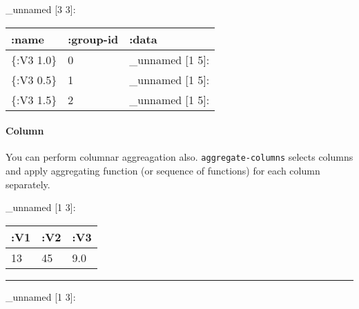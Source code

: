 \documentclass[]{article}
\newenvironment{Shaded}{\begin{snugshade}}{\end{snugshade}}
\newcommand{\AttributeTok}[1]{\textcolor[rgb]{0.77,0.63,0.00}{#1}}
\newcommand{\KeywordTok}[1]{\textcolor[rgb]{0.13,0.29,0.53}{\textbf{#1}}}
\newcommand{\NormalTok}[1]{#1}
\newcommand{\VariableTok}[1]{\textcolor[rgb]{0.00,0.00,0.00}{#1}}
\let\oldparagraph\paragraph
\renewcommand{\paragraph}[1]{\oldparagraph{#1}\mbox{}}
\begin{document}
\_unnamed {[}3 3{]}:

\begin{longtable}[]{@{}lll@{}}
\toprule
:name & :group-id & :data\tabularnewline
\midrule
\endhead
\{:V3 1.0\} & 0 & \_unnamed {[}1 5{]}:\tabularnewline
\{:V3 0.5\} & 1 & \_unnamed {[}1 5{]}:\tabularnewline
\{:V3 1.5\} & 2 & \_unnamed {[}1 5{]}:\tabularnewline
\bottomrule
\end{longtable}

\hypertarget{column}{%
\paragraph{Column}\label{column}}

You can perform columnar aggreagation also. \texttt{aggregate-columns}
selects columns and apply aggregating function (or sequence of
functions) for each column separately.

\begin{Shaded}
\end{Shaded}

\_unnamed {[}1 3{]}:

\begin{longtable}[]{@{}lll@{}}
\toprule
:V1 & :V2 & :V3\tabularnewline
\midrule
\endhead
13 & 45 & 9.0\tabularnewline
\bottomrule
\end{longtable}

\begin{center}\rule{0.5\linewidth}{0.5pt}\end{center}

\begin{Shaded}
\end{Shaded}

\_unnamed {[}1 3{]}:
\end{document}
